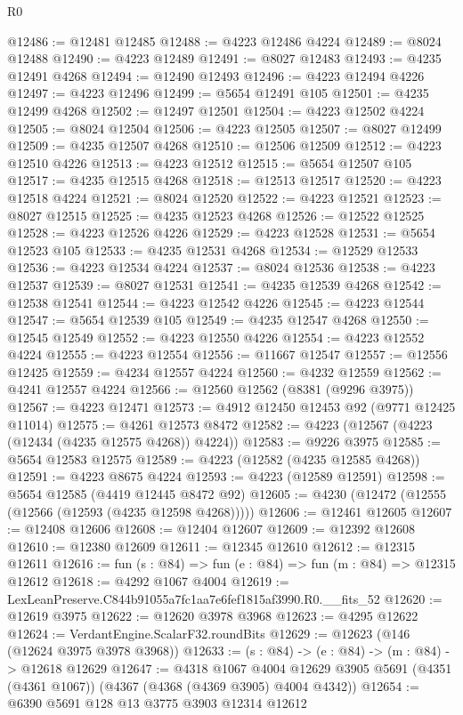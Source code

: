 \begin{lexlean}{R0}
\begin{coremodule}
@12486 := @12481 @12485
@12488 := @4223 @12486 @4224
@12489 := @8024 @12488
@12490 := @4223 @12489
@12491 := @8027 @12483
@12493 := @4235 @12491 @4268
@12494 := @12490 @12493
@12496 := @4223 @12494 @4226
@12497 := @4223 @12496
@12499 := @5654 @12491 @105
@12501 := @4235 @12499 @4268
@12502 := @12497 @12501
@12504 := @4223 @12502 @4224
@12505 := @8024 @12504
@12506 := @4223 @12505
@12507 := @8027 @12499
@12509 := @4235 @12507 @4268
@12510 := @12506 @12509
@12512 := @4223 @12510 @4226
@12513 := @4223 @12512
@12515 := @5654 @12507 @105
@12517 := @4235 @12515 @4268
@12518 := @12513 @12517
@12520 := @4223 @12518 @4224
@12521 := @8024 @12520
@12522 := @4223 @12521
@12523 := @8027 @12515
@12525 := @4235 @12523 @4268
@12526 := @12522 @12525
@12528 := @4223 @12526 @4226
@12529 := @4223 @12528
@12531 := @5654 @12523 @105
@12533 := @4235 @12531 @4268
@12534 := @12529 @12533
@12536 := @4223 @12534 @4224
@12537 := @8024 @12536
@12538 := @4223 @12537
@12539 := @8027 @12531
@12541 := @4235 @12539 @4268
@12542 := @12538 @12541
@12544 := @4223 @12542 @4226
@12545 := @4223 @12544
@12547 := @5654 @12539 @105
@12549 := @4235 @12547 @4268
@12550 := @12545 @12549
@12552 := @4223 @12550 @4226
@12554 := @4223 @12552 @4224
@12555 := @4223 @12554
@12556 := @11667 @12547
@12557 := @12556 @12425
@12559 := @4234 @12557 @4224
@12560 := @4232 @12559
@12562 := @4241 @12557 @4224
@12566 := @12560 @12562 (@8381 (@9296 @3975))
@12567 := @4223 @12471
@12573 := @4912 @12450 @12453 @92 (@9771 @12425 @11014)
@12575 := @4261 @12573 @8472
@12582 := @4223 (@12567 (@4223 (@12434 (@4235 @12575 @4268)) @4224))
@12583 := @9226 @3975
@12585 := @5654 @12583 @12575
@12589 := @4223 (@12582 (@4235 @12585 @4268))
@12591 := @4223 @8675 @4224
@12593 := @4223 (@12589 @12591)
@12598 := @5654 @12585 (@4419 @12445 @8472 @92)
@12605 := @4230 (@12472 (@12555 (@12566 (@12593 (@4235 @12598 @4268)))))
@12606 := @12461 @12605
@12607 := @12408 @12606
@12608 := @12404 @12607
@12609 := @12392 @12608
@12610 := @12380 @12609
@12611 := @12345 @12610
@12612 := @12315 @12611
@12616 := fun (s : @84) => fun (e : @84) => fun (m : @84) => @12315 @12612
@12618 := @4292 @1067 @4004
@12619 := LexLeanPreserve.C844b91055a7fc1aa7e6fef1815af3990.R0.__fits_52
@12620 := @12619 @3975
@12622 := @12620 @3978 @3968
@12623 := @4295 @12622
@12624 := VerdantEngine.ScalarF32.roundBits
@12629 := @12623 (@146 (@12624 @3975 @3978 @3968))
@12633 := (s : @84) -> (e : @84) -> (m : @84) -> @12618 @12629
@12647 := @4318
    @1067
    @4004
    @12629
    @3905
    @5691
    (@4351 (@4361 @1067))
    (@4367 (@4368 (@4369 @3905) @4004 @4342))
@12654 := @6390 @5691 @128 @13 @3775 @3903 @12314 @12612

\end{coremodule}
\end{lexlean}
